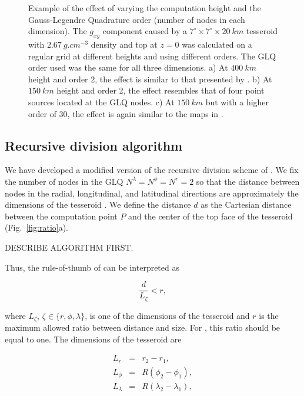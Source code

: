 \documentclass[extra]{gji}
\begin{document}
\begin{figure}
    \caption{
        Example of the effect of varying
        the computation height and the Gauss-Legendre Quadrature order
        (number of nodes in each dimension).
        The $g_{xy}$ component caused by a
        $7^\circ \times 7^\circ \times 20\ km$ tesseroid
        with $2.67\ g.cm^{-3}$ density
        and top at $z=0$
        was calculated on a regular grid
        at different heights and using different orders.
        The GLQ order used was the same for all three dimensions.
        a) At $400\ km$ height and order 2, the effect is similar to that
        presented by \citet{Asgharzadeh2007}. b) At $150\ km$ height and order
        2, the effect resembles that of four point sources located at the GLQ
        nodes. c) At $150\ km$ but with a higher order of 30, the effect is
        again similar to the maps in \citet{Asgharzadeh2007}.
    }
    \label{fig:sample}
\end{figure}

\subsection{Recursive division algorithm}

We have developed a modified version
of the recursive division scheme of \citet{Li2011}.
We fix the number of nodes in the GLQ
$N^\lambda=N^\phi=N^r=2$
so that the distance between nodes
in the radial, longitudinal, and latitudinal directions
are approximately the dimensions of the tesseroid
\citep{Wild-Pfeiffer2008}.
We define the distance $d$ as
the Cartesian distance between
the computation point $P$
and the center of the top face of the tesseroid
(Fig.~\ref{fig:ratio}a).

DESCRIBE ALGORITHM FIRST.

Thus, the rule-of-thumb of \citet{Ku1977}
can be interpreted as

\begin{equation}
    \frac{d}{L_\zeta} < r,
    \label{eq:ratio}
\end{equation}

\noindent
where
$L_\zeta$, $\zeta \in \{r, \phi, \lambda\}$,
is one of the dimensions of the tesseroid
and
$r$ is the maximum allowed ratio between distance and size.
For \citet{Ku1977}, this ratio should be equal to one.
The dimensions of the tesseroid are

\begin{eqnarray*}
    L_r &=& r_2 - r_1,\\
    L_\phi &=& R(\phi_2 - \phi_1),\\
    L_\lambda &=& R(\lambda_2 - \lambda_1),
\end{eqnarray*}
\end{document}
